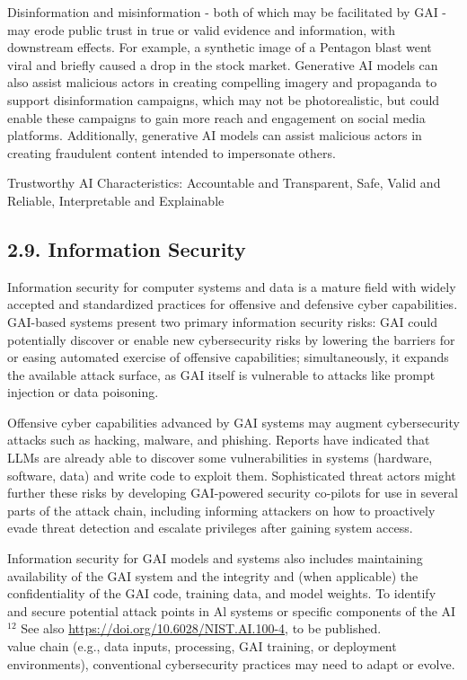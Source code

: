 \documentclass[10pt]{article}
\begin{document}
Disinformation and misinformation - both of which may be facilitated by GAI - may erode public trust in true or valid evidence and information, with downstream effects. For example, a synthetic image of a Pentagon blast went viral and briefly caused a drop in the stock market. Generative AI models can also assist malicious actors in creating compelling imagery and propaganda to support disinformation campaigns, which may not be photorealistic, but could enable these campaigns to gain more reach and engagement on social media platforms. Additionally, generative AI models can assist malicious actors in creating fraudulent content intended to impersonate others.

Trustworthy AI Characteristics: Accountable and Transparent, Safe, Valid and Reliable, Interpretable and Explainable
\subsection*{2.9. Information Security}
Information security for computer systems and data is a mature field with widely accepted and standardized practices for offensive and defensive cyber capabilities. GAI-based systems present two primary information security risks: GAI could potentially discover or enable new cybersecurity risks by lowering the barriers for or easing automated exercise of offensive capabilities; simultaneously, it expands the available attack surface, as GAI itself is vulnerable to attacks like prompt injection or data poisoning.

Offensive cyber capabilities advanced by GAI systems may augment cybersecurity attacks such as hacking, malware, and phishing. Reports have indicated that LLMs are already able to discover some vulnerabilities in systems (hardware, software, data) and write code to exploit them. Sophisticated threat actors might further these risks by developing GAI-powered security co-pilots for use in several parts of the attack chain, including informing attackers on how to proactively evade threat detection and escalate privileges after gaining system access.

Information security for GAI models and systems also includes maintaining availability of the GAI system and the integrity and (when applicable) the confidentiality of the GAI code, training data, and model weights. To identify and secure potential attack points in Al systems or specific components of the AI\\
${ }^{12}$ See also \href{https://doi.org/10.6028/NIST.AI.100-4}{https://doi.org/10.6028/NIST.AI.100-4}, to be published.\\
value chain (e.g., data inputs, processing, GAI training, or deployment environments), conventional cybersecurity practices may need to adapt or evolve.
\end{document}
